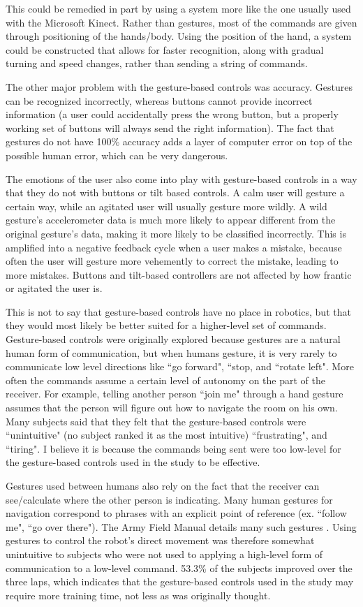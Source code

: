 \documentclass[12pt, letterpaper]{report}
\begin{document}
This could be remedied in part by using a system more like the one usually used with the Microsoft Kinect. Rather than gestures, most of the commands are given through positioning of the hands/body. Using the position of the hand, a system could be constructed that allows for faster recognition, along with gradual turning and speed changes, rather than sending a string of commands.

The other major problem with the gesture-based controls was accuracy. Gestures can be recognized incorrectly, whereas buttons cannot provide incorrect information (a user could accidentally press the wrong button, but a properly working set of buttons will always send the right information). The fact that gestures do not have 100\% accuracy adds a layer of computer error on top of the possible human error, which can be very dangerous.

The emotions of the user also come into play with gesture-based controls in a way that they do not with buttons or tilt based controls. A calm user will gesture a certain way, while an agitated user will usually gesture more wildly. A wild gesture's accelerometer data is much more likely to appear different from the original gesture's data, making it more likely to be classified incorrectly. This is amplified into a negative feedback cycle when a user makes a mistake, because often the user will gesture more vehemently to correct the mistake, leading to more mistakes. Buttons and tilt-based controllers are not affected by how frantic or agitated the user is. 

This is not to say that gesture-based controls have no place in robotics, but that they would most likely be better suited for a higher-level set of commands. Gesture-based controls were originally explored because gestures are a natural human form of communication, but when humans gesture, it is very rarely to communicate low level directions like ``go forward", ``stop, and ``rotate left". More often the commands assume a certain level of autonomy on the part of the receiver. For example, telling another person ``join me" through a hand gesture assumes that the person will figure out how to navigate the room on his own. Many subjects said that they felt that the gesture-based controls were ``unintuitive" (no subject ranked it as the most intuitive) ``frustrating", and ``tiring". I believe it is because the commands being sent were too low-level for the gesture-based controls used in the study to be effective. 

Gestures used between humans also rely on the fact that the receiver can see/calculate where the other person is indicating. Many human gestures for navigation correspond to phrases with an explicit point of reference (ex. ``follow me", ``go over there"). The Army Field Manual details many such gestures \cite{VisualSignals}. Using gestures to control the robot's direct movement was therefore somewhat unintuitive to subjects who were not used to applying a high-level form of communication to a low-level command. 53.3\% of the subjects improved over the three laps, which indicates that the gesture-based controls used in the study may require more training time, not less as was originally thought.
\end{document}
